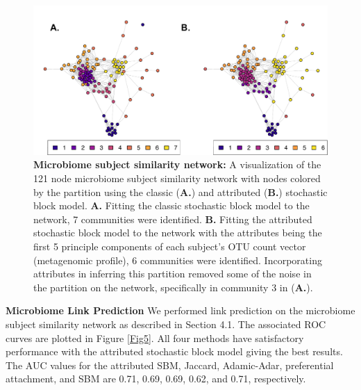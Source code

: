 \begin{figure}[h!]
\begin{center}
\includegraphics[width=1\textwidth]{MicrobiomeNets_May6.pdf}
\caption{{\bf Microbiome subject similarity network:} A visualization of the 121 node microbiome subject similarity network with nodes colored by the partition using the classic ({\bf A.}) and attributed ({\bf B.}) stochastic block model. {\bf A.} Fitting the classic stochastic block model to the network, 7 communities were identified. {\bf B.} Fitting the attributed stochastic block model to the network with the attributes being the first 5 principle components of each subject's OTU count vector (metagenomic profile), 6 communities were identified. Incorporating attributes in inferring this partition removed some of the noise in the partition on the network, specifically in community 3 in ({\bf A.}).}
\label{Fig4}
\end{center}
\end{figure}

{\bf Microbiome Link Prediction}
We performed link prediction on the microbiome subject similarity network as described in Section 4.1. The associated ROC curves are plotted in Figure \ref{Fig5}. All four methods have satisfactory performance with the attributed stochastic block model giving the best results. The AUC values for the attributed SBM, Jaccard, Adamic-Adar, preferential attachment, and SBM are 0.71, 0.69, 0.69, 0.62, and 0.71, respectively. 
 
